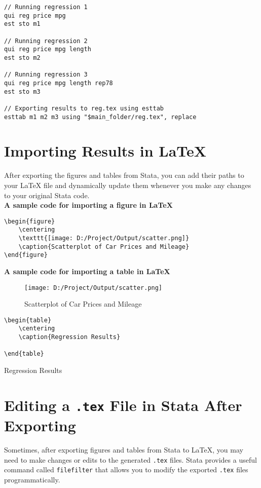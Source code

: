 \documentclass{article}
\begin{document}
\begin{verbatim}
// Running regression 1
qui reg price mpg
est sto m1

// Running regression 2
qui reg price mpg length
est sto m2

// Running regression 3
qui reg price mpg length rep78
est sto m3

// Exporting results to reg.tex using esttab
esttab m1 m2 m3 using "$main_folder/reg.tex", replace
\end{verbatim}

\section{Importing Results in {\LaTeX}}
After exporting the figures and tables from Stata, you can add their paths to your {\LaTeX} file and dynamically update them whenever you make any changes to your original Stata code.\\

\textbf{A sample code for importing a figure in {\LaTeX}} 
\begin{verbatim}
\begin{figure}
    \centering
    \texttt{[image: D:/Project/Output/scatter.png]}
    \caption{Scatterplot of Car Prices and Mileage}
\end{figure}
\end{verbatim}

\textbf{A sample code for importing a table in {\LaTeX}} 
\begin{figure}
    \centering
    \texttt{[image: D:/Project/Output/scatter.png]}
    \caption{Scatterplot of Car Prices and Mileage}
\end{figure}

\begin{verbatim}
\begin{table}
    \centering
    \caption{Regression Results}
    
\end{table}
\end{verbatim}

\begin{table}
    \centering
    \caption{Regression Results}
    
\end{table}

\newpage
\section{Editing a \texttt{.tex} File in Stata After Exporting}
Sometimes, after exporting figures and tables from Stata to \LaTeX, you may need to make changes or edits to the generated \texttt{.tex} files. Stata provides a useful command called \texttt{filefilter} that allows you to modify the exported \texttt{.tex} files programmatically. \\
\end{document}
